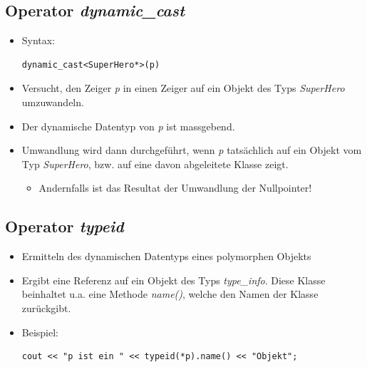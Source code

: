 \subsection{Operator \emph{dynamic\_cast}}
\label{sec:dynamic cast}
\begin{itemize}
	\item Syntax:\hspace{0.05\linewidth}
	\begin{minipage}{0.4\linewidth}
	\vspace{-\baselineskip}
\begin{lstlisting}
dynamic_cast<SuperHero*>(p)
\end{lstlisting}
	\end{minipage}
	\item Versucht, den Zeiger \emph{p} in einen Zeiger auf ein Objekt des Typs \emph{SuperHero} umzuwandeln.
	\item Der dynamische Datentyp von \emph{p} ist massgebend.
	\item Umwandlung wird dann durchgeführt, wenn \emph{p} tatsächlich auf ein Objekt vom Typ \emph{SuperHero}, bzw. auf eine davon abgeleitete Klasse zeigt.
	\begin{itemize}
		\item Andernfalls ist das Resultat der Umwandlung der Nullpointer!
	\end{itemize}
\end{itemize}

\subsection{Operator \emph{typeid}}
\begin{itemize}
	\item Ermitteln des dynamischen Datentyps eines polymorphen Objekts
	\item Ergibt eine Referenz auf ein Objekt des Typs \emph{type\_info}. Diese Klasse beinhaltet u.a. eine Methode \emph{name()}, welche den Namen der Klasse zurückgibt.
	\item Beispiel:\hspace{0.05\linewidth}
	\begin{minipage}{0.7\linewidth}
	\vspace{-\baselineskip}
\begin{lstlisting}
cout << "p ist ein " << typeid(*p).name() << "Objekt";
\end{lstlisting}
\end{minipage}
\end{itemize}


